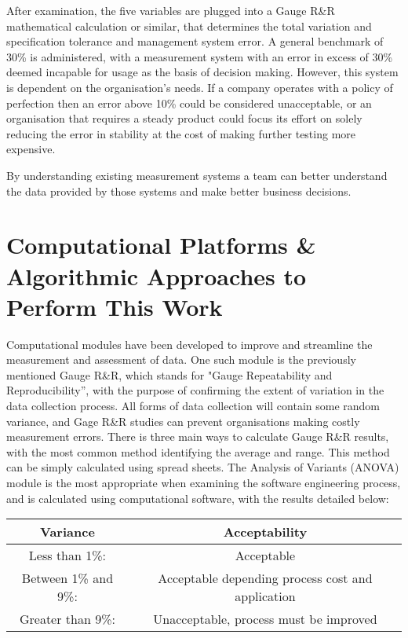 \documentclass{article}
\begin{document}
After examination, the five variables are plugged into a Gauge R\&R mathematical calculation or similar, that determines the total variation and specification tolerance and management system error. A general benchmark of 30\% is administered, with a measurement system with an error in excess of 30\% deemed incapable for usage as the basis of decision making. However, this system is dependent on the organisation's needs. If a company operates with a policy of perfection then an error above 10\% could be considered unacceptable, or an organisation that requires a steady product could focus its effort on solely reducing the error in stability at the cost of making further testing more expensive. \newline

By understanding existing measurement systems a team can better understand the data provided by those systems and make better business decisions. \cite{morestream}

\section{Computational Platforms \& Algorithmic Approaches to Perform This Work} Computational modules have been developed to improve and streamline the measurement and assessment of data. One such module is the previously mentioned Gauge R\&R, which stands for "Gauge Repeatability and Reproducibility'', with the purpose of confirming the extent of variation in the data collection process. All forms of data collection will contain some random variance, and Gage R\&R studies can prevent organisations making costly measurement errors. There is three main ways to calculate Gauge R\&R results, with the most common method identifying the average and range. This method can be simply calculated using spread sheets. The Analysis of Variants (ANOVA) module is the most appropriate when examining the software engineering process, and is calculated using computational software, with the results detailed below:

\begin{center}
\begin{tabular}{||c c||} 
\hline
Variance & Acceptability \\ 
\hline
Less than 1\%: & Acceptable \\ 
\hline
Between 1\% and 9\%: & Acceptable depending process cost and application \\
\hline
Greater than 9\%: & Unacceptable, process must be improved \\
\hline
\end{tabular}
\end{center}
\end{document}
